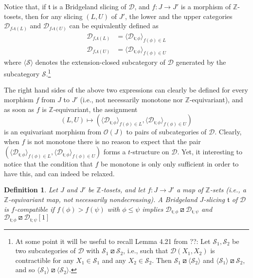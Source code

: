\documentclass{article}
\newtheorem{defn}[thm]{Definition}
\theoremstyle{definition}
\newcommand{\Z}{\mathbb{Z}}
\newcommand{\tee}{\mathfrak{t}}
\newcommand{\orth}{\boxslash}
\begin{document}
Notice that, if $\tee$ is a Bridgeland slicing of $\mathscr{D}$, and $f\colon J\to J'$ is a morphism of $\Z$-tosets, then for any slicing $(L,U)$ of $J'$, the lower and the upper categories
$\mathscr{D}_{f_*\tee(L)}$ and $\mathscr{D}_{f_*\tee(U)}$ can be equivalently defined as
\begin{align*}
\mathscr{D}_{f_*\tee(L)}&=\langle \mathscr{D}_{\tee;\phi}\rangle_{f(\phi)\in L}\\
\mathscr{D}_{f_*\tee(U)}&=\langle \mathscr{D}_{\tee;\phi}\rangle_{f(\phi)\in U}
\end{align*}
where $\langle \mathscr{S}\rangle$ denotes the extension-closed subcategory of $\mathscr{D}$ generated by the subcategory $\mathscr{S}$.\footnote{
At some point it will be useful to recall Lemma 4.21 from ??:
Let $\mathscr{S}_1,\mathscr{S}_2$ be two subcategories of $\mathscr{D}$ with $\mathscr{S}_1\orth \mathscr{S}_2$, i.e., such that $\mathscr{D}(X_1,X_2)$ is contractible for any $X_1\in \mathscr{S}_1$ and any $X_2\in\mathscr{S}_2$. Then $\mathscr{S}_1\orth \langle\mathscr{S}_2\rangle$ and $\langle\mathscr{S}_1\rangle\orth \mathscr{S}_2$, and so $\langle\mathscr{S}_1\rangle\orth \langle\mathscr{S}_2\rangle$.}

The right hand sides of the above two expressions can clearly be defined for every morphism $f$ from $J$ to $J'$ (i.e., not necessarily monotone nor $\Z$-equivariant), and as soon as $f$ is $\Z$-equivariant, the assignment
\[
(L,U)\mapsto (\langle \mathscr{D}_{\tee;\phi}\rangle_{f(\phi)\in L},\langle \mathscr{D}_{\tee;\phi}\rangle_{f(\phi)\in U})
\]
is an equivariant morphism from $\mathcal{O}(J)$ to pairs of subcategories of $\mathscr{D}$. Clearly, when $f$ is not monotone there is no reason to expect that the pair $(\langle \mathscr{D}_{\tee;\phi}\rangle_{f(\phi)\in L},\langle \mathscr{D}_{\tee;\phi}\rangle_{f(\phi)\in U})$ forms a $t$-structure on $\mathscr{D}$. Yet, it interesting to notice that the condition that $f$ be monotone is only only sufficient in order to have this, and can indeed be relaxed.

\begin{defn}\label{compatible}
Let $J$ and $J'$ be $\Z$-tosets, and let $f\colon J\to J'$ a map of $\Z$-sets (i.e., a $\Z$-equivariant map, not necessarily nondecreasing). A Bridgeland $J$-slicing $\tee$ of $\mathscr{D}$ is \emph{$f$-compatible}
if $f(\phi)>f(\psi)$ with $\phi\leq \psi$ implies $\mathscr{D}_{\tee; \phi}\orth \mathscr{D}_{\tee;\psi}$ and $\mathscr{D}_{\tee; \phi}\orth \mathscr{D}_{\tee;\psi}[1]$
\end{defn}
\end{document}
